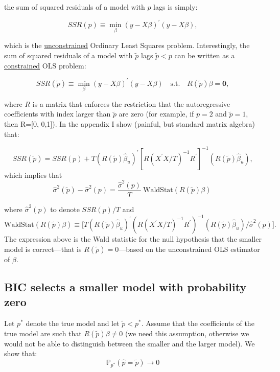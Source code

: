 \documentclass[12] {article}
\begin{document}
\noindent the sum of squared residuals of a model with $p$ lags is simply:

\[ SSR(p) \equiv \min_{\beta} (y-X \beta)^{\prime} (y-X \beta), \]

\noindent which is the \underline{unconstrained} Ordinary Least Squares problem. Interestingly, the sum of squared residuals of a model with $\tilde{p}$ lags $\tilde{p}<p$ can be written as a \underline{constrained} OLS problem:


\[ SSR(\tilde{p}) \equiv \min_{\beta} (y-X \beta)^{\prime} (y-X \beta) \quad \textrm{s.t.}\quad  R(\tilde{p})\beta = \textbf{0},  \]

\noindent where $R$ is a matrix that enforces the restriction that the autoregressive coefficients with index larger than $\tilde{p}$ are zero (for example, if $p=2$ and $\tilde{p}=1$, then R=[0, 0,1]). In the appendix I show (painful, but standard matrix algebra) that:

\begin{equation}
SSR(\tilde{p}) = SSR(p) + T( R(\tilde{p}) \widehat{\beta}_{u})^{\prime} \left[  R (X^{\prime} X/T )^{-1} R^{\prime} \right]^{-1}(R(\tilde{p}) \widehat{\beta}_{u}),
\end{equation}
which implies that
\begin{equation}
\widehat{\sigma}^2(\tilde{p}) - \widehat{\sigma}^2(p) = \frac{\widehat{\sigma}^2(p)}{T} \: \textrm{WaldStat} (R(\tilde{p})\beta) \: 
\end{equation}

\noindent where $\widehat{\sigma}^2(p)$ to denote $SSR(p)/T$ and
\[ \textrm{WaldStat} (R(\tilde{p})\beta) \equiv \big[ T (R(\tilde{p})\widehat{\beta}_u)^{\prime} (R(X^{\prime}X/T)^{-1}R^{\prime})^{-1}(R(\tilde{p})\widehat{\beta}_u)/ \widehat{\sigma}^2(p) \big]. \]
\noindent The expression above is the Wald statistic for the null hypothesis that the smaller model is correct---that is $R(\widetilde{\rho})=0$---based on the unconstrained OLS estimator of $\beta$. 

\subsection{BIC selects a smaller model with probability zero}

Let $p^*$ denote the true model and let $\tilde{p}<p^*$. Assume that the coefficients of the true model are such that $R(\tilde{p}) \beta \neq 0$ (we need this assumption, otherwise we would not be able to distinguish between the smaller and the larger model). We show that:
\begin{equation}
\mathbb{P}_{p^*}(\widehat{p} = \tilde{p}) \rightarrow 0
\end{equation}
\end{document}
